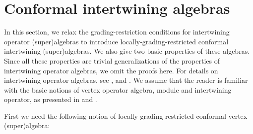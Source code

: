 \documentclass{amsproc}
\theoremstyle{definition}
\theoremstyle{remark}
\numberwithin{equation}{section}
\begin{document}
\section{Conformal intertwining algebras}




In this section, we relax the grading-restriction conditions 
for intertwining operator 
(super)algebras to introduce  locally-grading-restricted 
conformal intertwining
(super)algebras. We also give two basic properties of these algebras.  Since
all these properties are trivial generalizations of the properties of
intertwining operator algebras, we omit the proofs here. For
details on intertwining operator algebras, see \cite{H4}, \cite{H5}
and \cite{H6}.  We assume that the reader is familiar with the basic
notions of vertex operator algebra, module and intertwining operator,
as presented in \cite{FLM} and \cite{FHL}.

First we need the following notion of 
locally-grading-restricted conformal vertex (super)algebra:
\end{document}
